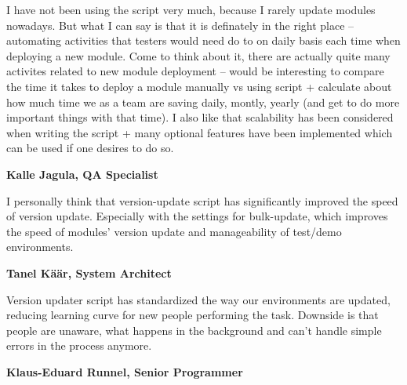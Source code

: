 \documentclass[12pt]{article}
\begin{document}
  \begin{displayquote}
  I have not been using the script very much, because I rarely update modules nowadays. But what I can say is that it is definately in the right place – automating activities that testers would need do to on daily basis each time when deploying a new module. Come to think about it, there are actually quite many activites related to new module deployment – would be interesting to compare the time it takes to deploy a module manually vs using script + calculate about how much time we as a team are saving daily, montly, yearly (and get to do more important things with that time).
I also like that scalability has been considered when writing the script + many optional features have been implemented which can be used if one desires to do so.
  \end{displayquote}
  
  \newpage

  \textbf{Kalle Jagula, QA Specialist}
  
  \begin{displayquote}
  I personally think that version-update script has significantly improved the speed of version update. Especially with the settings for bulk-update, which improves the speed of modules' version update and manageability of test/demo environments.
  \end{displayquote}
  
  \textbf{Tanel Käär, System Architect}
  
  \begin{displayquote}
  Version updater script has standardized the way our environments are updated, reducing learning curve for new people performing the task. Downside is that people are unaware, what happens in the background and can't handle simple errors in the process anymore.
  \end{displayquote}
  
  \textbf{Klaus-Eduard Runnel, Senior Programmer}
  
\end{document}
